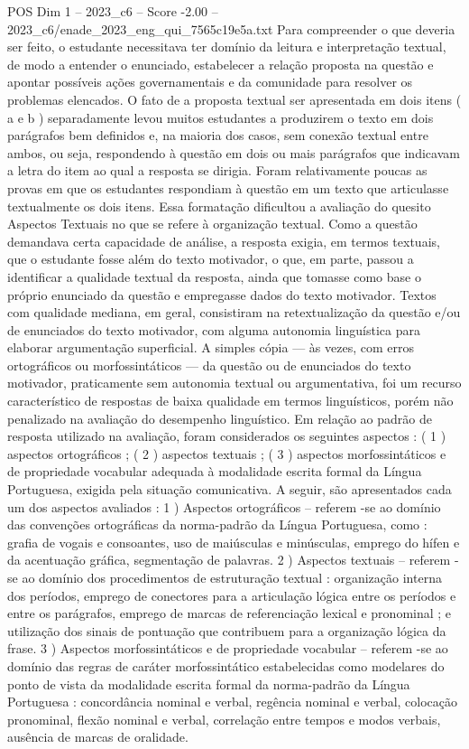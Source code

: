 \begin{textsample}{POS Dim 1 – 2023\_c6 – Score -2.00 – 2023\_c6/enade\_2023\_eng\_qui\_7565c19e5a.txt}
Para compreender o que deveria ser feito, o estudante necessitava ter domínio da leitura e interpretação textual, de modo a entender o enunciado, estabelecer a relação proposta na questão e apontar possíveis ações governamentais e da comunidade para resolver os problemas elencados.
O fato de a proposta textual ser apresentada em dois itens ( a e b ) separadamente levou muitos estudantes a produzirem o texto em dois parágrafos bem definidos e, na maioria dos casos, sem conexão textual entre ambos, ou seja, respondendo à questão em dois ou mais parágrafos que indicavam a letra do item ao qual a resposta se dirigia.
Foram relativamente poucas as provas em que os estudantes respondiam à questão em um texto que articulasse textualmente os dois itens.
Essa formatação dificultou a avaliação do quesito Aspectos Textuais no que se refere à organização textual.
Como a questão demandava certa capacidade de análise, a resposta exigia, em termos textuais, que o estudante fosse além do texto motivador, o que, em parte, passou a identificar a qualidade textual da resposta, ainda que tomasse como base o próprio enunciado da questão e empregasse dados do texto motivador.
Textos com qualidade mediana, em geral, consistiram na retextualização da questão e/ou de enunciados do texto motivador, com alguma autonomia linguística para elaborar argumentação superficial.
A simples cópia — às vezes, com erros ortográficos ou morfossintáticos — da questão ou de enunciados do texto motivador, praticamente sem autonomia textual ou argumentativa, foi um recurso característico de respostas de baixa qualidade em termos linguísticos, porém não penalizado na avaliação do desempenho linguístico.
Em relação ao padrão de resposta utilizado na avaliação, foram considerados os seguintes aspectos : ( 1 ) aspectos ortográficos ; ( 2 ) aspectos textuais ; ( 3 ) aspectos morfossintáticos e de propriedade vocabular adequada à modalidade escrita formal da Língua Portuguesa, exigida pela situação comunicativa.
A seguir, são apresentados cada um dos aspectos avaliados : 1 ) Aspectos ortográficos – referem -se ao domínio das convenções ortográficas da norma-padrão da Língua Portuguesa, como : grafia de vogais e consoantes, uso de maiúsculas e minúsculas, emprego do hífen e da acentuação gráfica, segmentação de palavras. 2 ) Aspectos textuais – referem -se ao domínio dos procedimentos de estruturação textual : organização interna dos períodos, emprego de conectores para a articulação lógica entre os períodos e entre os parágrafos, emprego de marcas de referenciação lexical e pronominal ; e utilização dos sinais de pontuação que contribuem para a organização lógica da frase. 3 ) Aspectos morfossintáticos e de propriedade vocabular – referem -se ao domínio das regras de caráter morfossintático estabelecidas como modelares do ponto de vista da modalidade escrita formal da norma-padrão da Língua Portuguesa : concordância nominal e verbal, regência nominal e verbal, colocação pronominal, flexão nominal e verbal, correlação entre tempos e modos verbais, ausência de marcas de oralidade.

\end{textsample}
